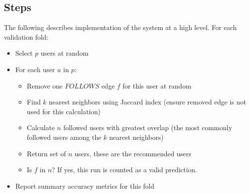 \subsection{Steps}
The following describes implementation of the system at a high level. For each validation fold:

\begin{itemize}
\item Select $p$ users at random
\item For each user $u$ in $p$:
	\begin{itemize}
	\item Remove one $FOLLOWS$ edge $f$ for this user at random
	\item Find $k$ nearest neighbors using Jaccard index (ensure removed edge is not used for this calculation)
	\item Calculate $n$ followed users with greatest overlap (the most commonly followed users among the $k$ nearest neighbors)
	\item Return set of $n$ users, these are the recommended users
	\item Is $f$ in $n$? If yes, this run is counted as a valid prediction.
	\end{itemize}
\item Report summary accuracy metrics for this fold
\end{itemize}


